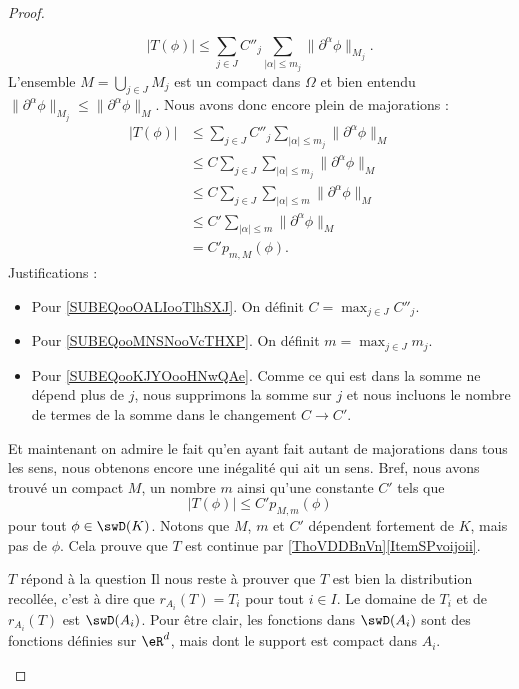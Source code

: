 \begin{proof}
\begin{subproof}
        \begin{equation}
            | T(\phi) |\leq \sum_{j\in J}C''_j\sum_{| \alpha |\leq m_j}\| \partial^{\alpha}\phi \|_{M_j}.
        \end{equation}
        L'ensemble \( M=\bigcup_{j\in J}M_j\) est un compact dans \( \Omega\) et bien entendu \( \| \partial^{\alpha}\phi \|_{M_j}\leq \| \partial^{\alpha}\phi \|_M\). Nous avons donc encore plein de majorations :
        \begin{subequations}
            \begin{align}
                | T(\phi) |&\leq \sum_{j\in J}C''_j\sum_{| \alpha |\leq m_j}\| \partial^{\alpha}\phi \|_M\\
                &\leq C\sum_{j\in J}\sum_{| \alpha |\leq m_j}\| \partial^{\alpha}\phi \|_M  \label{SUBEQooOALIooTlhSXJ}\\
                &\leq C\sum_{j\in J}\sum_{| \alpha |\leq m}\| \partial^{\alpha}\phi \|_M    \label{SUBEQooMNSNooVcTHXP}\\
                &\leq C'\sum_{| \alpha |\leq m}\| \partial^{\alpha}\phi \|_M \label{SUBEQooKJYOooHNwQAe}\\
                &=C'p_{m,M}(\phi).
            \end{align}
        \end{subequations}
        Justifications :
        \begin{itemize}
            \item Pour \ref{SUBEQooOALIooTlhSXJ}. On définit \( C=\max_{j\in J}C''_j\).
            \item Pour \ref{SUBEQooMNSNooVcTHXP}. On définit \( m=\max_{j\in J}m_j\).
            \item Pour \ref{SUBEQooKJYOooHNwQAe}. Comme ce qui est dans la somme ne dépend plus de \( j\), nous supprimons la somme sur \( j\) et nous incluons le nombre de termes de la somme dans le changement \( C\to C'\).
        \end{itemize}
        Et maintenant on admire le fait qu'en ayant fait autant de majorations dans tous les sens, nous obtenons encore une inégalité qui ait un sens. Bref, nous avons trouvé un compact \( M\), un nombre \( m\) ainsi qu'une constante \( C'\) tels que
        \begin{equation}
            | T(\phi) |\leq C'p_{M,m}(\phi)
        \end{equation}
        pour tout \( \phi\in \swD(K)\). Notons que \( M\), \( m\) et \( C'\) dépendent fortement de \( K\), mais pas de \( \phi\). Cela prouve que \( T\) est continue par \ref{ThoVDDBnVn}\ref{ItemSPvoijoii}.
    \item[$ T$ répond à la question]
        Il nous reste à prouver que \( T\) est bien la distribution recollée, c'est à dire que \( r_{A_i}(T)=T_i\) pour tout \( i\in I\). Le domaine de \( T_i\) et de \( r_{A_i}(T)\) est \( \swD(A_i)\). Pour être clair, les fonctions dans \( \swD(A_i)\) sont des fonctions définies sur \( \eR^d\), mais dont le support est compact dans \( A_i\).


\end{subproof}
\end{proof}
